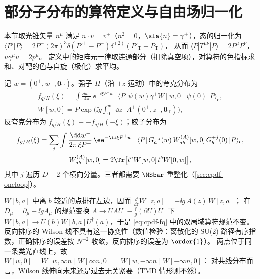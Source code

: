 \section{部分子分布的算符定义与自由场归一化}\label{sec:cpdf-def}

本节取光锥矢量 $n^\mu$ 满足 $n\cdot v=v^+$（$n^2=0$，$\sla{n}=\gamma^+$），态的归一化为
$\langle P'|P\rangle=2P^+(2\pi)^3\delta(P'^+-P^+)\delta^{(2)}(P'_{\mathrm T}-P_{\mathrm T})$，
从而 $\langle P|T^{\mu\nu}|P\rangle=2P^\mu P^\nu$，$\bar u\gamma^\mu u=2p^\mu$。
定义中的矩阵元一律取连通部分（扣除真空项），对算符的色指标求和、对靶的色与自旋（极化）求平均。

\begin{definition}[夸克、反夸克与胶子分布]\label{def:cpdf-pdfs}
记 $w=(0^+,w^-,\bm 0_{\mathrm T})$。强子 $H$（沿 $+z$ 运动）中的夸克分布为
\begin{equation}\label{eq:cpdf-fq}
\begin{gathered}
f_{q/H}(\xi)=\int\frac{\dd w^-}{4\pi}\,\ee^{-\ii\xi P^+w^-}\,
\langle P|\,\bar\psi(w)\gamma^+W[w,0]\,\psi(0)\,|P\rangle_{\mathrm c},\\
W[w,0]=P\exp\Big(\ii g\int_0^{w^-}\!\dd z^-A^+(0^+,z^-,\bm 0_{\mathrm T})\Big),
\end{gathered}
\end{equation}
反夸克分布为 $f_{\bar q/H}(\xi)\equiv-f_{q/H}(-\xi)$；胶子分布为
\begin{equation}\label{eq:cpdf-fg}
\begin{gathered}
f_{g/H}(\xi)=\sum_{j}\int\frac{\dd w^-}{2\pi\,\xi P^+}\,\ee^{-\ii\xi P^+w^-}\,
\langle P|\,G^{+j}_a(w)\,W^{(A)}_{ab}[w,0]\,G^{+j}_b(0)\,|P\rangle_{\mathrm c},\\
W^{(A)}_{ab}[w,0]=2\Tr\big[t^aW[w,0]\,t^bW[0,w]\big],
\end{gathered}
\end{equation}
其中 $j$ 遍历 $D-2$ 个横向分量。三者都需要 $\MSbar$ 重整化（\cref{sec:cpdf-oneloop}）。
\end{definition}

\begin{remark}\label{rem:cpdf-wilson}
$W[b,a]$ 中离 $b$ 较近的点排在左边，因而 $\frac{\dd}{\dd z}W[z,a]=+\ii g\,A(z)\,W[z,a]$；
在 $D_\mu=\partial_\mu-\ii gA_\mu$ 的规范变换 $A\to UAU^\dagger-\frac{\ii}{g}(\partial U)U^\dagger$ 下
$W[b,a]\to U(b)W[b,a]U^\dagger(a)$，于是 \cref{eq:cpdf-fq} 中的双局域算符规范不变。
反向排序的 Wilson 线不具有这一协变性（数值检验：离散化的 SU(2) 路径有序指数，正确排序的误差按 $N^{-2}$ 收敛，反向排序的误差为 $\order{1}$）。
两点位于同一条类光直线上，故 $W[w,0]=W[w,\infty n]\,W[\infty n,0]=W[w,-\infty n]\,W[-\infty n,0]$：
对共线分布而言，Wilson 线伸向未来还是过去无关紧要（TMD 情形则不然）。
\end{remark}

